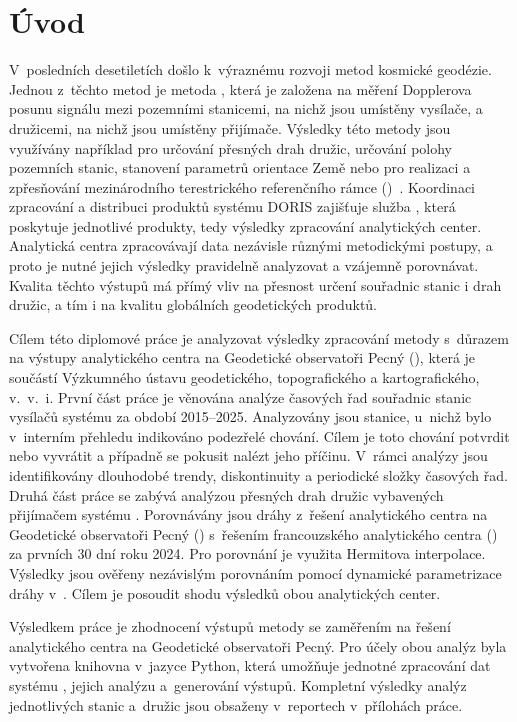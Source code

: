 \chapter{Úvod}
\label{1-uvod}

V~posledních desetiletích došlo k~výraznému rozvoji metod kosmické geodézie. Jednou z~těchto metod je metoda , která je založena na měření Dopplerova posunu signálu mezi pozemními stanicemi, na nichž jsou umístěny vysílače, a družicemi, na nichž jsou umístěny přijímače. Výsledky této metody jsou využívány například pro určování přesných drah družic, určování polohy pozemních stanic, stanovení parametrů orientace Země nebo pro realizaci a zpřesňování mezinárodního terestrického referenčního rámce ()~\cite{ids_what_is_doris}. Koordinaci zpracování a distribuci produktů systému DORIS zajišťuje služba , která poskytuje jednotlivé produkty, tedy výsledky zpracování analytických center. Analytická centra  zpracovávají data nezávisle různými metodickými postupy, a proto je nutné jejich výsledky pravidelně analyzovat a vzájemně porovnávat. Kvalita těchto výstupů má přímý vliv na přesnost určení souřadnic stanic i drah družic, a tím i na kvalitu globálních geodetických produktů.

Cílem této diplomové práce je analyzovat výsledky zpracování metody  s~důrazem na výstupy analytického centra na Geodetické observatoři Pecný (), která je součástí Výzkumného ústavu geodetického, topografického a kartogra\-fického, v.~v.~i. První část práce je věnována analýze časových řad souřadnic stanic vysílačů systému  za období 2015--2025. Analyzovány jsou stanice, u~nichž bylo v~interním přehledu  indikováno podezřelé chování. Cílem je toto chování potvrdit nebo vyvrátit a případně se pokusit nalézt jeho příčinu. V~rámci analýzy jsou identifikovány dlouhodobé trendy, diskontinuity a periodické složky časových řad. Druhá část práce se zabývá analýzou přesných drah družic vybavených přijímačem systému . Porovnávány jsou dráhy z~řešení analytického centra na Geodetické observatoři Pecný () s~řešením francouzského analytického centra () za prvních 30 dní roku 2024. Pro porovnání je využita Hermitova interpolace. Výsledky jsou ověřeny nezávislým porovnáním pomocí dynamické parametrizace dráhy v~. Cílem je posoudit shodu výsledků obou analytických center.

Výsledkem práce je zhodnocení výstupů metody  se zaměřením na řešení analytického centra na Geodetické observatoři Pecný. Pro účely obou analýz byla vytvořena knihovna v~jazyce Python, která umožňuje jednotné zpracování dat systému , jejich analýzu a~generování výstupů. Kompletní výsledky analýz jednotlivých stanic a~družic jsou obsaženy v~reportech v~přílohách práce.